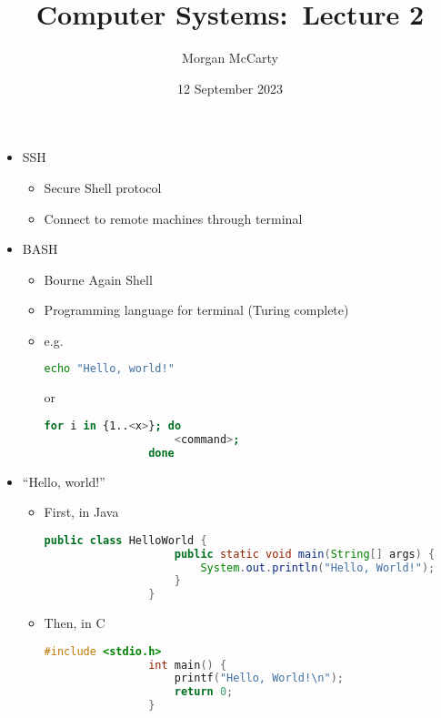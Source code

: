 \documentclass[12pt]{article}
\title{
    Computer Systems:\ Lecture 2}
\author{Morgan McCarty}
\date{12 September 2023}
\begin{document}
    \maketitle

    \begin{itemize}
        \item SSH
        \begin{itemize}
            \item Secure Shell protocol
            \item Connect to remote machines through terminal
        \end{itemize}
        \item BASH
        \begin{itemize}
            \item Bourne Again Shell
            \item Programming language for terminal (Turing complete)
            \item e.g.
            \begin{lstlisting}[language=bash,gobble=16]
                echo "Hello, world!"
            \end{lstlisting}
            or
            \begin{lstlisting}[language=bash,gobble=16]
                for i in {1..<x>}; do
                    <command>;
                done
            \end{lstlisting}
        \end{itemize}
        \item ``Hello, world!''
        \begin{itemize}
            \item First, in Java
            \begin{lstlisting}[language=java,gobble=16]
                public class HelloWorld {
                    public static void main(String[] args) {
                        System.out.println("Hello, World!");
                    }
                }
            \end{lstlisting}
            \item Then, in C
            \begin{lstlisting}[language=c,gobble=16]
                #include <stdio.h>
                int main() {
                    printf("Hello, World!\n");
                    return 0;
                }
            \end{lstlisting}
        \end{itemize}
    \end{itemize}
\end{document}
